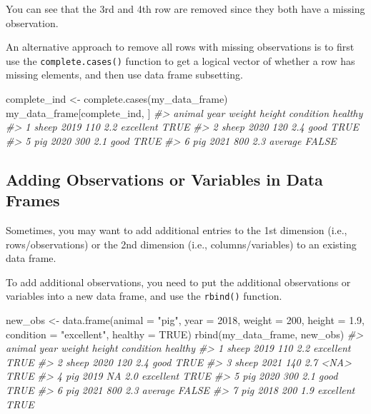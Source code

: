 \documentclass[
]{book}
\newenvironment{Shaded}{\begin{snugshade}}{\end{snugshade}}
\newcommand{\AttributeTok}[1]{\textcolor[rgb]{0.77,0.63,0.00}{#1}}
\newcommand{\CommentTok}[1]{\textcolor[rgb]{0.56,0.35,0.01}{\textit{#1}}}
\newcommand{\ConstantTok}[1]{\textcolor[rgb]{0.00,0.00,0.00}{#1}}
\newcommand{\DecValTok}[1]{\textcolor[rgb]{0.00,0.00,0.81}{#1}}
\newcommand{\FloatTok}[1]{\textcolor[rgb]{0.00,0.00,0.81}{#1}}
\newcommand{\FunctionTok}[1]{\textcolor[rgb]{0.00,0.00,0.00}{#1}}
\newcommand{\NormalTok}[1]{#1}
\newcommand{\OtherTok}[1]{\textcolor[rgb]{0.56,0.35,0.01}{#1}}
\newcommand{\StringTok}[1]{\textcolor[rgb]{0.31,0.60,0.02}{#1}}
\begin{document}
You can see that the 3rd and 4th row are removed since they both have a missing observation.

An alternative approach to remove all rows with missing observations is to first use the \texttt{complete.cases()} function to get a logical vector of whether a row has missing elements, and then use data frame subsetting.

\begin{Shaded}
\begin{Highlighting}[]
\NormalTok{complete\_ind }\OtherTok{\textless{}{-}} \FunctionTok{complete.cases}\NormalTok{(my\_data\_frame)}
\NormalTok{my\_data\_frame[complete\_ind, ]}
\CommentTok{\#\textgreater{}   animal year weight height condition healthy}
\CommentTok{\#\textgreater{} 1  sheep 2019    110    2.2 excellent    TRUE}
\CommentTok{\#\textgreater{} 2  sheep 2020    120    2.4      good    TRUE}
\CommentTok{\#\textgreater{} 5    pig 2020    300    2.1      good    TRUE}
\CommentTok{\#\textgreater{} 6    pig 2021    800    2.3   average   FALSE}
\end{Highlighting}
\end{Shaded}

\hypertarget{adding-observations-or-variables-in-data-frames}{%
\subsection{Adding Observations or Variables in Data Frames}\label{adding-observations-or-variables-in-data-frames}}

Sometimes, you may want to add additional entries to the 1st dimension (i.e., rows/observations) or the 2nd dimension (i.e., columns/variables) to an existing data frame.

To add additional observations, you need to put the additional observations or variables into a new data frame, and use the \texttt{rbind()} function.

\begin{Shaded}
\begin{Highlighting}[]
\NormalTok{new\_obs }\OtherTok{\textless{}{-}} \FunctionTok{data.frame}\NormalTok{(}\AttributeTok{animal =} \StringTok{"pig"}\NormalTok{, }\AttributeTok{year =} \DecValTok{2018}\NormalTok{, }\AttributeTok{weight =} \DecValTok{200}\NormalTok{, }\AttributeTok{height =} \FloatTok{1.9}\NormalTok{, }\AttributeTok{condition =} \StringTok{"excellent"}\NormalTok{, }\AttributeTok{healthy =} \ConstantTok{TRUE}\NormalTok{)}
\FunctionTok{rbind}\NormalTok{(my\_data\_frame, new\_obs)}
\CommentTok{\#\textgreater{}   animal year weight height condition healthy}
\CommentTok{\#\textgreater{} 1  sheep 2019    110    2.2 excellent    TRUE}
\CommentTok{\#\textgreater{} 2  sheep 2020    120    2.4      good    TRUE}
\CommentTok{\#\textgreater{} 3  sheep 2021    140    2.7      \textless{}NA\textgreater{}    TRUE}
\CommentTok{\#\textgreater{} 4    pig 2019     NA    2.0 excellent    TRUE}
\CommentTok{\#\textgreater{} 5    pig 2020    300    2.1      good    TRUE}
\CommentTok{\#\textgreater{} 6    pig 2021    800    2.3   average   FALSE}
\CommentTok{\#\textgreater{} 7    pig 2018    200    1.9 excellent    TRUE}
\end{Highlighting}
\end{Shaded}
\end{document}
